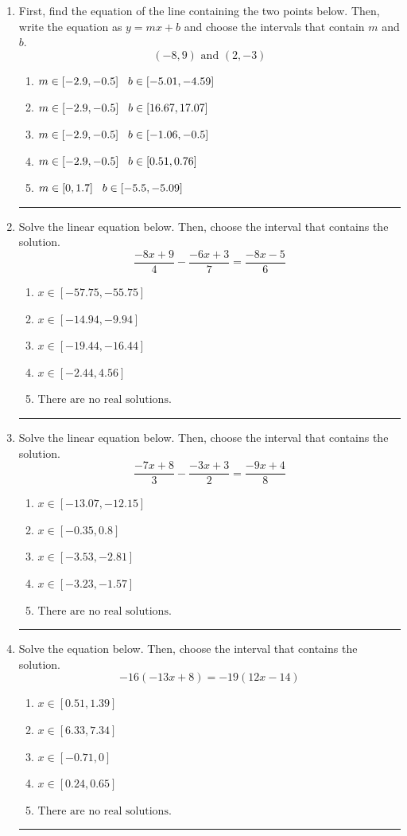 \documentclass[14pt]{extbook}
\newcommand{\litem}[1]{\item#1\hspace*{-1cm}\rule{\textwidth}{0.4pt}}
\begin{document}
\begin{enumerate}
{\begin{enumerate}[label=\Alph*.]
\end{enumerate} }
\litem{
First, find the equation of the line containing the two points below. Then, write the equation as $ y=mx+b $ and choose the intervals that contain $m$ and $b$.\[ (-8, 9) \text{ and } (2, -3) \]\begin{enumerate}[label=\Alph*.]
\item \( m \in [-2.9, -0.5] \hspace*{3mm} b \in [-5.01, -4.59] \)
\item \( m \in [-2.9, -0.5] \hspace*{3mm} b \in [16.67, 17.07] \)
\item \( m \in [-2.9, -0.5] \hspace*{3mm} b \in [-1.06, -0.5] \)
\item \( m \in [-2.9, -0.5] \hspace*{3mm} b \in [0.51, 0.76] \)
\item \( m \in [0, 1.7] \hspace*{3mm} b \in [-5.5, -5.09] \)

\end{enumerate} }
\litem{
Solve the linear equation below. Then, choose the interval that contains the solution.\[ \frac{-8x + 9}{4} - \frac{-6x + 3}{7} = \frac{-8x -5}{6} \]\begin{enumerate}[label=\Alph*.]
\item \( x \in [-57.75, -55.75] \)
\item \( x \in [-14.94, -9.94] \)
\item \( x \in [-19.44, -16.44] \)
\item \( x \in [-2.44, 4.56] \)
\item \( \text{There are no real solutions.} \)

\end{enumerate} }
\litem{
Solve the linear equation below. Then, choose the interval that contains the solution.\[ \frac{-7x + 8}{3} - \frac{-3x + 3}{2} = \frac{-9x + 4}{8} \]\begin{enumerate}[label=\Alph*.]
\item \( x \in [-13.07, -12.15] \)
\item \( x \in [-0.35, 0.8] \)
\item \( x \in [-3.53, -2.81] \)
\item \( x \in [-3.23, -1.57] \)
\item \( \text{There are no real solutions.} \)

\end{enumerate} }
\litem{
Solve the equation below. Then, choose the interval that contains the solution.\[ -16(-13x + 8) = -19(12x -14) \]\begin{enumerate}[label=\Alph*.]
\item \( x \in [0.51, 1.39] \)
\item \( x \in [6.33, 7.34] \)
\item \( x \in [-0.71, 0] \)
\item \( x \in [0.24, 0.65] \)
\item \( \text{There are no real solutions.} \)

\end{enumerate} }
\end{enumerate}
\end{document}

